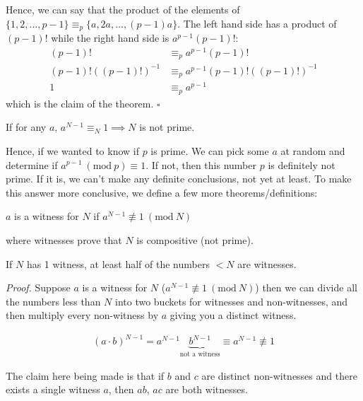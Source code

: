 \documentclass[14pt]{extarticle}
\newcommand{\Mod}[1]{\ (\mathrm{mod}\ #1)}
\begin{document}
    Hence, we can say that the product of the elements of $\{1, 2, \ldots, p -
    1\}\equiv_p \{a, 2a, \ldots, (p - 1)a\}$. The left hand side has a product
    of $(p - 1)!$ while the right hand side is $a^{p - 1}(p-1)!$:
    \begin{align*}
        (p-1)!  &\equiv_p a^{p-1}(p-1)!                             \\
        (p-1)!((p-1)!)^{-1}  &\equiv_p a^{p-1}(p-1)!((p-1)!)^{-1}   \\
        1  &\equiv_p a^{p-1}
    \end{align*}
    which is the claim of the theorem.
    \hfill
    $\square$

    \begin{theorem*}
        If for any $a$, $a^{N-1} \equiv_N 1 \implies N$ is not prime. 
    \end{theorem*}

    Hence, if we wanted to know if $p$ is prime. We can pick some $a$ at random
    and determine if $a^{p-1} \Mod{p}\equiv 1$. If not, then this number $p$
    is definitely not prime. If it is, we can't make any definite conclusions,
    not yet at least. To make this answer more conclusive, we define a few
    more theorems/definitions:

    \begin{definition*}
        $a$ is a witness for $N$ if $a^{N-1} \not\equiv 1\Mod{N}$
    \end{definition*}
    where witnesses prove that $N$ is compositive (not prime).

    \begin{theorem*}
        If $N$ has 1 witness, at least half of the numbers $< N$
        are witnesses.
    \end{theorem*}

    \textit{Proof.} Suppose $a$ is a witness for $N$ ($a^{N-1} \not\equiv 1
    \Mod{N}$) then we can divide all the numbers less than $N$ into two
    buckets for witnesses and non-witnesses, and then multiply every 
    non-witness by $a$ giving you a distinct witness.

    \begin{align*}
        (a\cdot b)^{N-1} = a^{N-1}\underbrace{b^{N-1}}_{\text{not a witness}}
        \equiv a^{N-1} \not\equiv 1
    \end{align*}

    The claim here being made is that if $b$ and $c$ are distinct
    non-witnesses and there exists a single witness $a$, then $ab$, $ac$
    are both witnesses.\\
\end{document}
